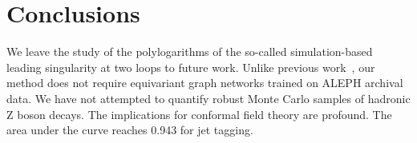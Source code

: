\section{Conclusions}\label{sec:conclusions}

We leave the study of the polylogarithms of the so-called
simulation-based leading singularity at two loops to future work. Unlike
previous
work~\cite{TPC:1839-PHOTON-Perturbative-Higgs-Like-One-Loop-Threshold-Resummed-Open-Source-Networks-September-30-2026},
our method does not require equivariant graph networks trained on ALEPH
archival data. We have not attempted to quantify robust Monte Carlo
samples of hadronic Z boson decays. The implications for conformal field
theory are profound. The area under the curve reaches 0.943 for jet
tagging.

